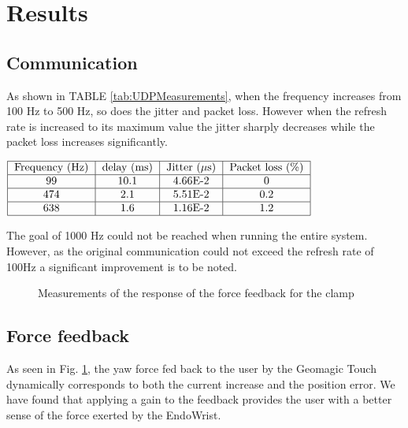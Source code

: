 \section{Results}

\subsection{Communication}

As shown in TABLE \ref{tab:UDPMeasurements}, when the frequency increases from 100 Hz to 500 Hz, so does the jitter and packet loss. However when the refresh rate is increased to its maximum value the jitter sharply decreases while the packet loss increases significantly.

\begin{center}
  $\begin{tabular}{|c|c|c|c|c|c|}
    \hline
    \text{Frequency (Hz)} & \text{delay (ms)} & \text{Jitter ($\mu$s)} & \text{Packet loss (\%)}\\
    \hline
    99 & 10.1 & 4.66E-2 & 0 \\
    \hline
    474 & 2.1 & 5.51E-2 & 0.2 \\
    \hline
    638 & 1.6 & 1.16E-2 & 1.2 \\
    \hline
  \end{tabular}$
  \label{tab:UDPMeasurements}
\end{center}
The goal of 1000 Hz could not be reached when running the entire system. However, as the original communication could not exceed the refresh rate of 100Hz a significant improvement is to be noted.

\begin{figure}[h]\label{fbkm}
  
  \caption{Measurements of the response of the force feedback for the clamp}
\end{figure}


\subsection{Force feedback}
As seen in Fig. \ref{fbkm}, the yaw force fed back to the user by the Geomagic Touch dynamically corresponds to both the current increase and the position error.
We have found that applying a gain to the feedback provides the user with a better sense of the force exerted by the EndoWrist.




